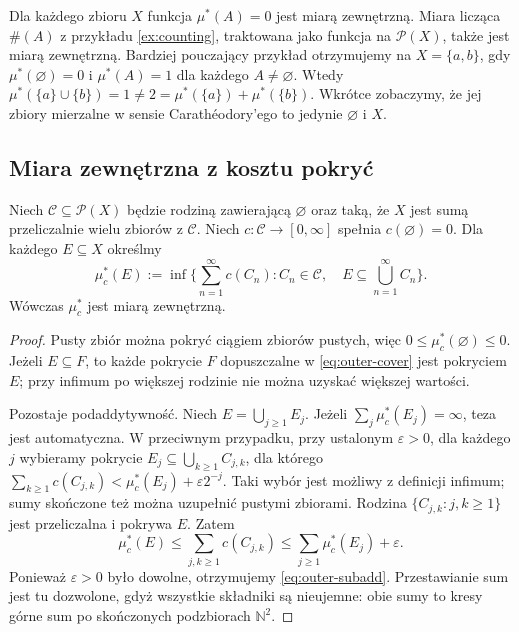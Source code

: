 \begin{przyklad}
Dla każdego zbioru $X$ funkcja $\mu^*(A)=0$ jest miarą zewnętrzną.
Miara licząca $\#(A)$ z przykładu \ref{ex:counting}, traktowana
jako funkcja na $\mathcal P(X)$, także jest miarą zewnętrzną.
Bardziej pouczający przykład otrzymujemy na $X=\{a,b\}$, gdy
$\mu^*(\varnothing)=0$ i $\mu^*(A)=1$ dla każdego $A\ne\varnothing$.
Wtedy $\mu^*(\{a\}\cup\{b\})=1\ne2=\mu^*(\{a\})+\mu^*(\{b\})$.
Wkrótce zobaczymy, że jej zbiory mierzalne w sensie Carathéodory'ego
to jedynie $\varnothing$ i $X$.
\end{przyklad}

\subsection{Miara zewnętrzna z kosztu pokryć}

\begin{twierdzenie}
\label{thm:outer-from-cover}
Niech $\mathcal C\subseteq\mathcal P(X)$ będzie rodziną zawierającą
$\varnothing$ oraz taką, że $X$ jest sumą przeliczalnie wielu zbiorów
z $\mathcal C$. Niech $c:\mathcal C\to[0,\infty]$ spełnia
$c(\varnothing)=0$. Dla każdego $E\subseteq X$ określmy
\begin{equation}\label{eq:outer-cover}
\mu_c^*(E):=\inf\Big\{\sum_{n=1}^\infty c(C_n):
C_n\in\mathcal C,\quad E\subseteq\bigcup_{n=1}^\infty C_n\Big\}.
\end{equation}
Wówczas $\mu_c^*$ jest miarą zewnętrzną.
\end{twierdzenie}

\begin{proof}
Pusty zbiór można pokryć ciągiem zbiorów pustych, więc
$0\le\mu_c^*(\varnothing)\le0$. Jeżeli $E\subseteq F$, to każde
pokrycie $F$ dopuszczalne w \eqref{eq:outer-cover} jest pokryciem $E$;
przy infimum po większej rodzinie nie można uzyskać większej wartości.

Pozostaje podaddytywność. Niech $E=\bigcup_{j\ge1}E_j$.
Jeżeli $\sum_j\mu_c^*(E_j)=\infty$, teza jest automatyczna.
W przeciwnym przypadku, przy ustalonym $\varepsilon>0$, dla każdego
$j$ wybieramy pokrycie $E_j\subseteq\bigcup_{k\ge1}C_{j,k}$, dla
którego
$\sum_{k\ge1}c(C_{j,k})<\mu_c^*(E_j)+\varepsilon2^{-j}$.
Taki wybór jest możliwy z definicji infimum; sumy skończone też
można uzupełnić pustymi zbiorami. Rodzina
$\{C_{j,k}:j,k\ge1\}$ jest przeliczalna i pokrywa $E$. Zatem
\[
\mu_c^*(E)\le \sum_{j,k\ge1}c(C_{j,k})
\le\sum_{j\ge1}\mu_c^*(E_j)+\varepsilon.
\]
Ponieważ $\varepsilon>0$ było dowolne, otrzymujemy
\eqref{eq:outer-subadd}. Przestawianie sum jest tu dozwolone,
gdyż wszystkie składniki są nieujemne: obie sumy to kresy górne
sum po skończonych podzbiorach $\mathbb N^2$.
\end{proof}

